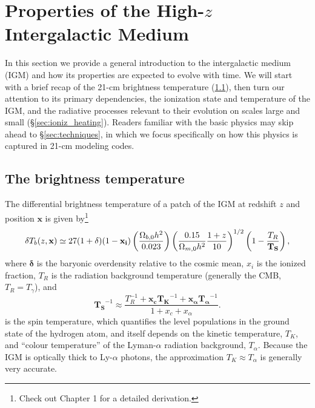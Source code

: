 \section{Properties of the High-$z$ Intergalactic Medium} \label{sec:RT}
In this section we provide a general introduction to the intergalactic medium (IGM) and how its properties are expected to evolve with time. We will start with a brief recap of the 21-cm brightness temperature (\ref{sec:dTb}), then turn our attention to its primary dependencies, the ionization state and temperature of the IGM, and the radiative processes relevant to their evolution on scales large and small (\S\ref{sec:ioniz_heating}). Readers familiar with the basic physics may skip ahead to \S\ref{sec:techniques}, in which we focus specifically on how this physics is captured in 21-cm modeling codes.

\subsection{The brightness temperature} \label{sec:dTb}
The differential brightness temperature of a patch of the IGM at redshift $z$ and position $\mathbf{x}$ is given by\footnote{Check out Chapter 1 for a detailed derivation.} 
\begin{equation}
    \delta T_b(z, \mathbf{x}) \simeq 27 (1 + \boldmath{\delta}) (1 - \mathbf{x_i}) \left(\frac{\Omega_{b,0} h^2}{0.023} \right) \left(\frac{0.15}{\Omega_{m,0} h^2} \frac{1 + z}{10} \right)^{1/2} \left(1 - \frac{T_R}{\mathbf{T_S}} \right) , \label{eq:dTb}
\end{equation}
where $\mathbf{\delta}$ is the baryonic overdensity relative to the cosmic mean, $x_i$ is the ionized fraction, $T_R$ is the radiation background temperature (generally the CMB, $T_R = T_{\gamma}$), and
\begin{equation}
    \mathbf{T_S}^{-1} \approx \frac{T_R^{-1} + \mathbf{x_c} \mathbf{T_K}^{-1} + \mathbf{x_{\alpha}} \mathbf{T_{\alpha}}^{-1}}{1 + x_c + x_{\alpha}} . \label{eq:Ts}
\end{equation}
is the spin temperature, which quantifies the level populations in the ground state of the hydrogen atom, and itself depends on the kinetic temperature, $T_K$, and ``colour temperature'' of the Lyman-$\alpha$ radiation background, $T_{\alpha}$. Because the IGM is optically thick to Ly-$\alpha$ photons, the approximation $T_K \approx T_{\alpha}$ is generally very accurate.

